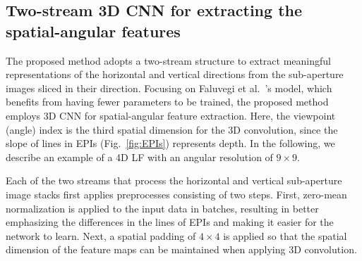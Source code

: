 \documentclass[]{spie}
\newcommand{\jtextd}[1]{}
\begin{document}
\subsection{Two-stream 3D CNN for extracting the spatial-angular features}
\label{sec:two-stream}
\jtextd{
   提案手法では，水平方向と垂直方向の意味のある表現を抽出するために，2ストリーム構造を採用する．
   Faluv{\'e}giら~\cite{faluvegi20193d}
のモデルにおける
   学習パラメータ数の少なさに着目し，提案手法においても空間-角度特徴抽出のために3D CNNを用いる．
   ここで，EPIsにおける直線の傾きが奥行きを表すことから，
   3次元畳み込みのための第3の空間次元として視点（角度）インデックスを使用する．
以下では，$9 \times 9$の角度分解能を持つ4D LFを例として説明する．
}

The proposed method adopts a two-stream structure to extract 
meaningful representations of the horizontal and vertical directions
from the sub-aperture images sliced in their direction.
Focusing on Faluv{e}gi et al.~\cite{faluvegi20193d}'s model, which
benefits from having fewer parameters to be trained, the proposed
method employs 3D CNN for spatial-angular feature extraction.
Here, the viewpoint (angle) index is the third spatial
dimension for the 3D convolution, since the slope of lines in EPIs
(Fig.~\ref{fig:EPIs}) represents depth.
In the following, we describe an example of a 4D LF with an angular
resolution of $9 \times 9$.

\jtextd{
   提案方式を構成する2つのストリームでは，それぞれ2ステップの前処理を行う．
   まず，入力データに対し，バッチ単位でゼロ平均正規化を行う．
これによりEPIsの線がより強調され，ネットワークの学習が容易になる．
   次に，
3次元畳み込みが適用された際に特徴マップの空間次元を維持できるよう，
$4 \times 4$の空間パディングを適用する．
}

Each of the two streams that process the horizontal and vertical
sub-aperture image stacks first applies preprocesses consisting of two
steps.
First, zero-mean normalization is applied to the input data in
batches, resulting in better emphasizing the differences in the lines of EPIs
and making it easier for the network to learn.
Next, a spatial padding of $4\times 4$ is applied so that the spatial
dimension of the feature maps can be maintained when applying 3D
convolution.


\jtextd{
   各ストリームは，ストライド幅が1，サイズが$3 \times 3 \times 3$のカーネルを使用した
   3次元畳み込み層を4層連ねた構成をとる．
   出力する特徴マップ数は，最初の畳み込み層は32個，残り3層の畳み込み層は64個である．
   特徴マップのサイズは，4層の3次元畳み込み層によって，
ビューの数に対応する
次元は9から1に縮小され，
   空間次元は入力と同等のサイズに維持される．
}
\end{document}
